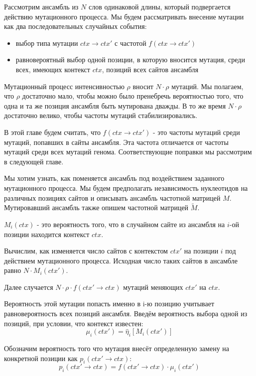 \documentclass[a4paper]{article}
\begin{document}
Рассмотрим ансамбль из $N$ слов одинаковой длины, который подвергается действию мутационного процесса. Мы будем рассматривать внесение мутации как два последовательных случайных события:
\begin{itemize}
\item выбор типа мутации $ctx \to ctx'$ с частотой $f(ctx \to ctx')$
\item равновероятный выбор одной позиции, в которую вносится мутация, среди всех, имеющих контекст $ctx$, позиций всех сайтов ансамбля
\end{itemize}

Мутационный процесс интенсивностью $\rho$ вносит $N\cdot\rho$ мутаций. Мы полагаем, что $\rho$ достаточно мало, чтобы можно было пренебречь вероятностью того, что одна и та же позиция ансамбля быть мутирована дважды. В то же время $N\cdot\rho$ достаточно велико, чтобы частоты мутаций стабилизировались.

В этой главе будем считать, что $f(ctx\to ctx')$ - это частоты мутаций среди мутаций, попавших в сайты ансамбля. Эта частота отличается от частоты мутаций среди всех мутаций генома. Соответствующие поправки мы рассмотрим в следующей главе.

Мы хотим узнать, как поменяется ансамбль под воздействием заданного мутационного процесса. Мы будем предполагать независимость нуклеотидов на различных позициях сайтов и описывать ансамбль частотной матрицей $M$. Мутировавший ансамбль также опишем частотной матрицей $\widetilde{M}$.

$M_i(ctx)$ - это вероятность того, что в случайном сайте из ансамбля на $i$-ой позиции находится контекст $ctx$.

Вычислим, как изменяется число сайтов с контекстом $ctx'$ на позиции $i$ под действием мутационного процесса. Исходная число таких сайтов в ансамбле равно $N\cdot M_i(ctx')$. 

Далее случается $N\cdot\rho\cdot f(ctx' \to ctx)$ мутаций меняющих $ctx'$ на $ctx$.

Вероятность этой мутации попасть именно в i-ю позицию учитывает равновероятность всех позиций ансамбля. Введём вероятность выбора одной из позиций, при условии, что контекст известен:
\begin{equation}
\mu_i(ctx') = \widehat{\eta}_i \left[ M_i(ctx') \right] 
\end{equation}


Обозначим вероятность того что мутация внесёт определенную замену на конкретной позиции как $p_i(ctx' \to ctx)$:
\begin{equation}
p_i(ctx' \to ctx) = f(ctx' \to ctx)\cdot\mu_i(ctx')
\end{equation}
\end{document}

